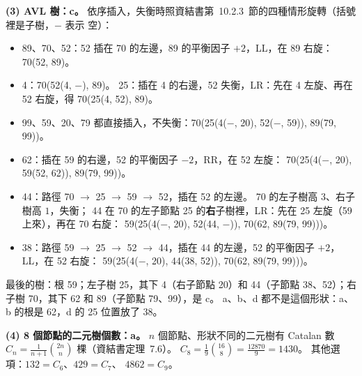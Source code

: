 \begin{pastsoln}
\textbf{(3) AVL 樹：c。} 依序插入，失衡時照資結書第~10.2.3~節的四種情形旋轉（括號裡是子樹，$-$ 表示
空）：
\begin{itemize}
\item 89、70、52：52 插在 70 的左邊，89 的平衡因子 $+2$，LL，在 89 右旋：70(52, 89)。
\item 4：70(52(4, $-$), 89)。 25：插在 4 的右邊，52 失衡，LR：先在 4 左旋、再在 52 右旋，得
70(25(4, 52), 89)。
\item 99、59、20、79 都直接插入，不失衡：70(25(4($-$, 20), 52($-$, 59)), 89(79, 99))。
\item 62：插在 59 的右邊，52 的平衡因子 $-2$，RR，在 52 左旋：
70(25(4($-$, 20), 59(52, 62)), 89(79, 99))。
\item 44：路徑 70 $\to$ 25 $\to$ 59 $\to$ 52，插在 52 的左邊。 70 的左子樹高 $3$、右子樹高 $1$，失衡；
44 在 70 的左子節點 25 的\textbf{右}子樹裡，LR：先在 25 左旋（59 上來），再在 70 右旋：
59(25(4($-$, 20), 52(44, $-$)), 70(62, 89(79, 99)))。
\item 38：路徑 59 $\to$ 25 $\to$ 52 $\to$ 44，插在 44 的左邊，52 的平衡因子 $+2$，LL，在 52 右旋：
59(25(4($-$, 20), 44(38, 52)), 70(62, 89(79, 99)))。
\end{itemize}
最後的樹：根 59；左子樹 25，其下 4（右子節點 20）和 44（子節點 38、52）；右子樹 70，其下 62 和
89（子節點 79、99），是 c。 a、b、d 都不是這個形狀：a、b 的根是 62，d 的 25 位置放了 38。

\textbf{(4) 8 個節點的二元樹個數：a。} $n$ 個節點、形狀不同的二元樹有 Catalan 數
$C_n = \frac{1}{n + 1}\binom{2n}{n}$ 棵（資結書定理~7.6）。
$C_8 = \frac{1}{9}\binom{16}{8} = \frac{12870}{9} = 1430$。 其他選項：$132 = C_6$、$429 = C_7$、
$4862 = C_9$。


\end{pastsoln}
